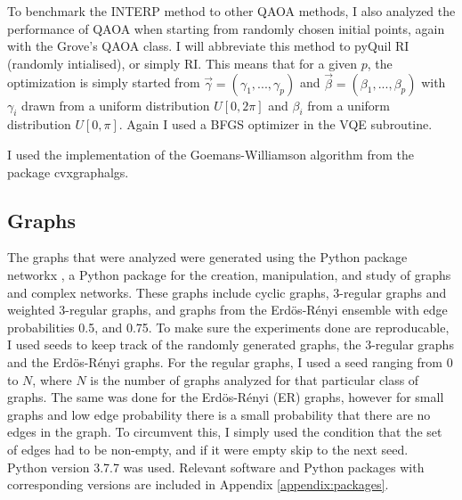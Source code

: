 To benchmark the INTERP method to other QAOA methods, I also analyzed the performance of QAOA when starting from randomly chosen initial points, again with the Grove's QAOA class. I will abbreviate this method to pyQuil RI (randomly intialised), or simply RI. This means that for a given $p$, the optimization is simply started from $\vec{\gamma} = (\gamma_1,...,\gamma_p)$ and $\vec{\beta} = (\beta_1,...,\beta_p)$ with $\gamma_i$ drawn from a uniform distribution $U[0,2\pi]$ and $\beta_i$ from a uniform distribution $U[0,\pi]$. Again I used a BFGS optimizer in the VQE subroutine.

I used the implementation of the Goemans-Williamson algorithm from the package cvxgraphalgs. 

\subsection{Graphs}
The graphs that were analyzed were generated using the Python package networkx \cite{networkx}, a Python package for the creation, manipulation, and study of graphs and complex networks. These graphs include cyclic graphs, 3-regular graphs and weighted 3-regular graphs, and graphs from the Erd\"os-R\'enyi ensemble with edge probabilities 0.5, and 0.75. To make sure the experiments done are reproducable, I used seeds to keep track of the randomly generated graphs, the 3-regular graphs and the Erd\"os-R\'enyi graphs. For the regular graphs, I used a seed ranging from 0 to $N$, where $N$ is the number of graphs analyzed for that particular class of graphs. The same was done for the Erd\"os-R\'enyi (ER) graphs, however for small graphs and low edge probability there is a small probability that there are no edges in the graph. To circumvent this, I simply used the condition that the set of edges had to be non-empty, and if it were empty skip to the next seed.\\

Python version 3.7.7 was used. Relevant software and Python packages with corresponding versions are included in Appendix \ref{appendix:packages}.
